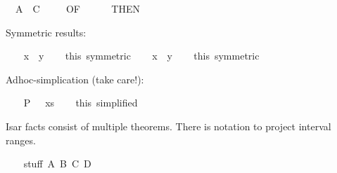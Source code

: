 \begin{isabellebody}
\ {}{}\ {}A\ {}\ C{}\isanewline
\ \ \isamarkupfalse%
\ {}\ {}OF\ {}{}\isanewline
\ \ \isamarkupfalse%
\ {}\ {}THEN\ {}{}%
\begin{isamarkuptxt}%
Symmetric results:%
\end{isamarkuptxt}%
\isamarkuptrue%
\ \ \isamarkupfalse%
\ {}x\ {}\ y{}\isanewline
\ \ \isamarkupfalse%
\ this\ {}symmetric{}\isanewline
\isanewline
\ \ \isamarkupfalse%
\ {}x\ {}\ y{}\isanewline
\ \ \isamarkupfalse%
\ this\ {}symmetric{}%
\begin{isamarkuptxt}%
Adhoc-simplication (take care!):%
\end{isamarkuptxt}%
\isamarkuptrue%
\ \ \isamarkupfalse%
\ {}P\ {}{}{}\ {}\ xs{}{}\isanewline
\ \ \isamarkupfalse%
\ this\ {}simplified{}%
\endisatagproof
{\isafoldproof}%
%
\isadelimproof
%
\endisadelimproof
\isanewline
{}\isamarkupfalse%
%
\isamarkuptrue%
%
\begin{isamarkuptext}%
Isar facts consist of multiple theorems.  There is notation to project
  interval ranges.%
\end{isamarkuptext}%
\isamarkuptrue%
\isamarkupfalse%
\isanewline
{}\isanewline
%
\isadelimproof
\ \ %
\endisadelimproof
%
\isatagproof
{}\isamarkupfalse%
\ stuff{}\ A\ B\ C\ D\isanewline

\end{isabellebody}
